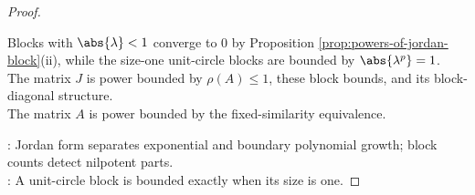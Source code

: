 \begin{theorem}
\begin{proof}
\begin{enumerate}[label=(\roman*)]
Blocks with $\abs{\lambda}<1$ converge to $0$ by Proposition \ref{prop:powers-of-jordan-block}(ii), while the size-one unit-circle blocks are bounded by $\abs{\lambda^p}=1$.\\
The matrix $J$ is power bounded by $\rho(A)\leq1$, these block bounds, and its block-diagonal structure.\\
The matrix $A$ is power bounded by the fixed-similarity equivalence.
\end{enumerate}
: Jordan form separates exponential and boundary polynomial growth; block counts detect nilpotent parts.\\
: A unit-circle block is bounded exactly when its size is one.
\end{proof}
\end{theorem}
